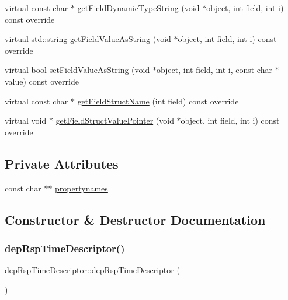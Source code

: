 \begin{DoxyCompactItemize}
\item 
virtual const char $\ast$ \hyperlink{classdepRspTimeDescriptor_a792f2bfcb1f116dd06437d885ff72f48}{get\+Field\+Dynamic\+Type\+String} (void $\ast$object, int field, int i) const override
\item 
virtual std\+::string \hyperlink{classdepRspTimeDescriptor_acdc1e2c5d57b9ade8cdd45472ca82719}{get\+Field\+Value\+As\+String} (void $\ast$object, int field, int i) const override
\item 
virtual bool \hyperlink{classdepRspTimeDescriptor_a33a783027f6e9c827228f9405f485f63}{set\+Field\+Value\+As\+String} (void $\ast$object, int field, int i, const char $\ast$value) const override
\item 
virtual const char $\ast$ \hyperlink{classdepRspTimeDescriptor_a55d83a6906074344459de31d49e51e1d}{get\+Field\+Struct\+Name} (int field) const override
\item 
virtual void $\ast$ \hyperlink{classdepRspTimeDescriptor_ad6ca81a9ae888ced8f540d844900f30d}{get\+Field\+Struct\+Value\+Pointer} (void $\ast$object, int field, int i) const override
\end{DoxyCompactItemize}
\subsection*{Private Attributes}
\begin{DoxyCompactItemize}
\item 
const char $\ast$$\ast$ \hyperlink{classdepRspTimeDescriptor_aa00fe09f472957d38fb825d538d5c090}{propertynames}
\end{DoxyCompactItemize}


\subsection{Constructor \& Destructor Documentation}
\mbox{\label{classdepRspTimeDescriptor_a1c9b594074be83beb7009019d66da91e}} 
\subsubsection{\texorpdfstring{dep\+Rsp\+Time\+Descriptor()}{depRspTimeDescriptor()}}
{\footnotesize\ttfamily dep\+Rsp\+Time\+Descriptor\+::dep\+Rsp\+Time\+Descriptor (\begin{DoxyParamCaption}{ }\end{DoxyParamCaption})}

